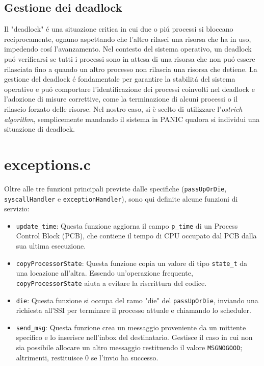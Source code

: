\documentclass[a4paper]{article}
\begin{document}
\subsection{Gestione dei deadlock}
Il "deadlock" \'e una situazione critica in cui due o pi\'u processi si bloccano reciprocamente, ognuno aspettando che l'altro rilasci una risorsa che ha in uso, impedendo cos\'i l'avanzamento. Nel contesto del sistema operativo, un deadlock pu\'o verificarsi se tutti i processi sono in attesa di una risorsa che non pu\'o essere rilasciata fino a quando un altro processo non rilascia una risorsa che detiene. La gestione del deadlock \'e fondamentale per garantire la stabilit\'a del sistema operativo e pu\'o comportare l'identificazione dei processi coinvolti nel deadlock e l'adozione di misure correttive, come la terminazione di alcuni processi o il rilascio forzato delle risorse. Nel nostro caso, si è scelto di utilizzare l'\textit{ostrich algorithm}, semplicemente mandando il sistema in PANIC qualora si individui una situazione di deadlock.


\section{exceptions.c}
Oltre alle tre funzioni principali previste dalle specifiche (\verb+passUpOrDie+, \verb+syscallHandler+ e \verb+exceptionHandler+), sono qui definite alcune funzioni di servizio:

\begin{itemize}
\item \verb+update_time+: Questa funzione aggiorna il campo \verb+p_time+ di un Process Control Block (PCB), che contiene il tempo di CPU occupato dal PCB dalla sua ultima esecuzione.
\item \verb+copyProcessorState+: Questa funzione copia un valore di tipo \verb+state_t+ da una locazione all'altra. Essendo un'operazione frequente, \verb+copyProcessorState+ aiuta a evitare la riscrittura del codice.
\item \verb+die+: Questa funzione si occupa del ramo "die" del \verb+passUpOrDie+, inviando una richiesta all'SSI per terminare il processo attuale e chiamando lo scheduler.
\item \verb+send_msg+: Questa funzione crea un messaggio proveniente da un mittente specifico e lo inserisce nell'inbox del destinatario. Gestisce il caso in cui non sia possibile allocare un altro messaggio restituendo il valore \verb+MSGNOGOOD+; altrimenti, restituisce 0 se l'invio ha successo.
\end{itemize}
\end{document}
